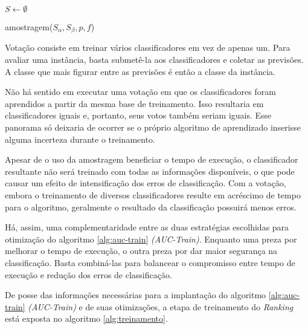 \begin{function}[h!]

    $S \gets \emptyset$\;
    


    \caption{amostragem($S_{\alpha}, S_{\beta}, p, f$)}
    \label{func:amostragem}
\end{function}

Votação consiste em treinar vários classificadores em vez de apenas um. Para avaliar uma instância, basta submetê-la aos classificadores e coletar as previsões. A classe que mais figurar entre as previsões é então a classe da instância.

Não há sentido em executar uma votação em que os classificadores foram aprendidos a partir da mesma base de treinamento. Isso resultaria em classificadores iguais e, portanto, seus votos também seriam iguais. Esse panorama só deixaria de ocorrer se o próprio algoritmo de aprendizado inserisse alguma incerteza durante o treinamento.

Apesar de o uso da amostragem beneficiar o tempo de execução, o classificador resultante não será treinado com todas as informações disponíveis, o que pode causar um efeito de intensificação dos erros de classificação. Com a votação, embora o treinamento de diversos classificadores resulte em acréscimo de tempo para o algoritmo, geralmente o resultado da classificação possuirá menos erros.

Há, assim, uma complementaridade entre as duas estratégias escolhidas para otimização do algoritmo \ref{alg:auc-train} \emph{(AUC-Train)}. Enquanto uma preza por melhorar o tempo de execução, o outra preza por dar maior segurança na classificação. Basta combiná-las para balancear o compromisso entre tempo de execução e redução dos erros de classificação.

De posse das informações necessárias para a implantação do algoritmo \ref{alg:auc-train} \emph{(AUC-Train)} e de suas otimizações, a etapa de treinamento do \emph{Ranking} está exposta no algoritmo \ref{alg:treinamento}.

